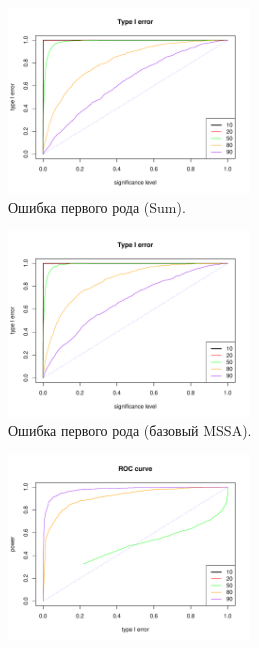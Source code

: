 \documentclass[specialist,
substylefile = spbu_report.rtx,
subf,href,colorlinks=true, 12pt]{disser}
\theoremstyle{definition}
\begin{document}
\begin{figure}[h!]
	\captionsetup[subfigure]{justification=Centering}
	\begin{subfigure}[t]{0.45\textwidth}
		\centering
		\includegraphics[width=0.7\textwidth]{img/type1error_sum_fa.pdf}
		\caption{Ошибка первого рода (Sum).}
		\label{fig:sum_fa_a}
	\end{subfigure}\hspace{\fill}
	\begin{subfigure}[t]{0.45\textwidth}
		\centering
		\includegraphics[width=0.7\textwidth]{img/type1error_mssa_fa.pdf}
		\caption{Ошибка первого рода (базовый MSSA).}
	\end{subfigure}
	\bigskip
	\begin{subfigure}[t]{0.45\textwidth}
		\centering
		\includegraphics[width=0.7\textwidth]{img/roc_sum_fa.pdf}

\end{subfigure}
\end{figure}
\end{document}
